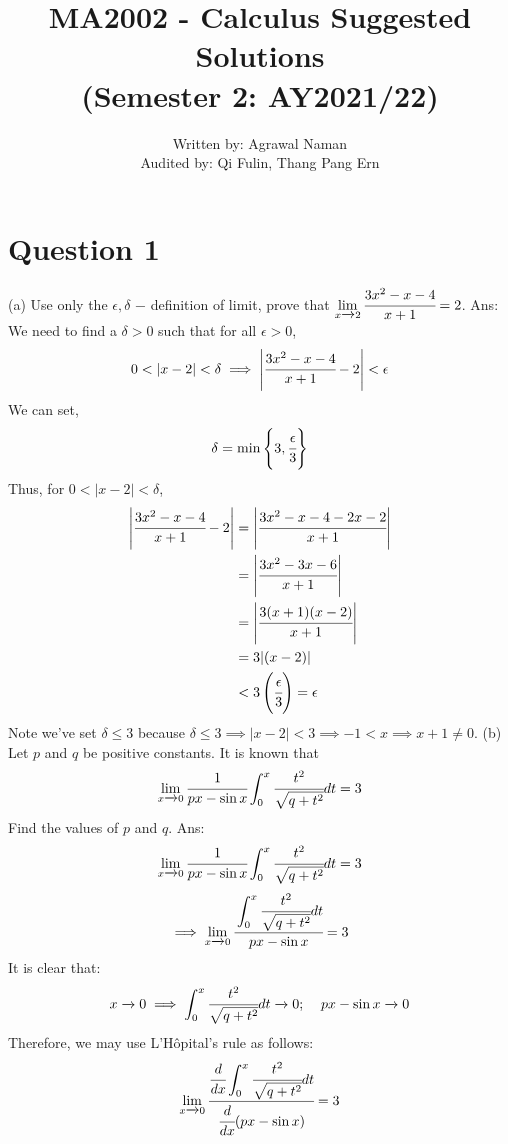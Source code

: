 \documentclass{article}
\title{%
  MA2002 - Calculus Suggested Solutions  \\ 
  \large (Semester 2: AY2021/22) \\ }
\author{%
  \large
    Written by: Agrawal Naman \\
    Audited by: Qi Fulin, Thang Pang Ern}
\begin{document}
\maketitle %



\section*{Question 1}
(a) Use only the $\epsilon, \delta$ − definition of limit, prove that $\displaystyle\lim_{x \xrightarrow{} 2} \cfrac{3x^2-x-4}{x+1}=2$.
\newline
\newline
Ans:
\\ We need to find a $\delta > 0$ such that for all $\epsilon > 0$,
$$0 < |x-2| < \delta \implies \Bigg | \cfrac{3x^2-x-4}{x+1} - 2 \Bigg | < \epsilon$$
We can set,
$$\delta = \min \left\{3, \cfrac{\epsilon}{3}\right\}$$
Thus, for $0 < |x-2| < \delta $,
\begin{align*}
    \Bigg | \cfrac{3x^2-x-4}{x+1} - 2 \Bigg |
    & = \Bigg | \cfrac{3x^2-x-4-2x-2}{x+1}\Bigg | \\
    & = \Bigg | \cfrac{3x^2-3x-6}{x+1}\Bigg | \\
    & = \Bigg | \cfrac{3(x+1)(x-2)}{x+1}\Bigg | \\
    & = 3 | (x-2)| \\
    & < 3 \left(\cfrac{\epsilon}{3}\right) = \epsilon
\end{align*}
Note we've set $\delta \leq 3$ because $ \delta \leq 3 \implies |x - 2| < 3 \implies -1 < x \implies x + 1 \neq 0 $.
\newline
\newline
(b) Let $p$ and $q$ be positive constants. It is known that
$$\lim_{x \xrightarrow{} 0} \cfrac{1}{px-\sin x} \int_{0}^{x} \cfrac{t^2}{\sqrt{q+t^2}}dt = 3$$
Find the values of $p$ and $q$.
\newline
\newline
Ans:
$$\lim_{x \xrightarrow{} 0} \cfrac{1}{px-\sin x} \int_{0}^{x} \cfrac{t^2}{\sqrt{q+t^2}}dt = 3$$
$$\implies \lim_{x \xrightarrow{} 0} \cfrac{\displaystyle\int_{0}^{x} \cfrac{t^2}{\sqrt{q+t^2}}dt}{px-\sin x}  = 3$$
It is clear that:
$$x \xrightarrow{} 0 \implies \displaystyle\int_{0}^{x} \cfrac{t^2}{\sqrt{q+t^2}}dt \xrightarrow{} 0; \;\;\;\; px-\sin x \xrightarrow{} 0$$
Therefore, we may use L'Hôpital's rule as follows:
$$\lim_{x \xrightarrow{} 0} \cfrac{\cfrac{d}{dx}\displaystyle\int_{0}^{x} \cfrac{t^2}{\sqrt{q+t^2}}dt}{\cfrac{d}{dx} (px-\sin x)}  = 3$$
\end{document}

